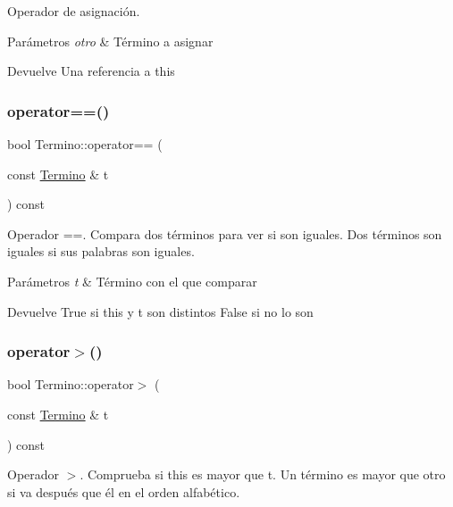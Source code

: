 Operador de asignación. 


\begin{DoxyParams}{Parámetros}
{\em otro} & Término a asignar \\
\hline
\end{DoxyParams}
\begin{DoxyReturn}{Devuelve}
Una referencia a this 
\end{DoxyReturn}
\mbox{\label{classTermino_adf075fbce1b208a5214e9364e5f2520a}} 
\subsubsection{\texorpdfstring{operator==()}{operator==()}}
{\footnotesize\ttfamily bool Termino\+::operator== (\begin{DoxyParamCaption}\item[{const \hyperlink{classTermino}{Termino} \&}]{t }\end{DoxyParamCaption}) const}



Operador ==. Compara dos términos para ver si son iguales. Dos términos son iguales si sus palabras son iguales. 


\begin{DoxyParams}{Parámetros}
{\em t} & Término con el que comparar \\
\hline
\end{DoxyParams}
\begin{DoxyReturn}{Devuelve}
True si this y t son distintos False si no lo son 
\end{DoxyReturn}
\mbox{\label{classTermino_a72be5a52ffa4dbf55ecd6dfb6af12476}} 
\subsubsection{\texorpdfstring{operator$>$()}{operator>()}}
{\footnotesize\ttfamily bool Termino\+::operator$>$ (\begin{DoxyParamCaption}\item[{const \hyperlink{classTermino}{Termino} \&}]{t }\end{DoxyParamCaption}) const}



Operador $>$. Comprueba si this es mayor que t. Un término es mayor que otro si va después que él en el orden alfabético. 


